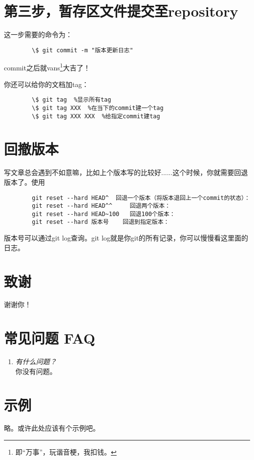 \documentclass[cn,hazy,sakura,screen,14pt]{elegantnote}
\begin{document}
	\section{第三步，暂存区文件提交至repository}
	这一步需要的命令为：
	\begin{lstlisting}
		\$ git commit -m "版本更新日志"	
	\end{lstlisting}	
	commit之后就vans\footnote{即“万事”，玩谐音梗，我扣钱。}大吉了！

	\begin{note}
		你还可以给你的文档加tag：
		\begin{lstlisting}
		\$ git tag  %显示所有tag
		\$ git tag XXX 	%在当下的commit建一个tag
		\$ git tag XXX XXX 	%给指定commit建tag
		\end{lstlisting}
	\end{note}
	
	\section{回撤版本}	
	写文章总会遇到不如意嘛，比如上个版本写的比较好......这个时候，你就需要回退版本了。使用
	\begin{lstlisting}
		git reset --hard HEAD^ 	回退一个版本（将版本退回上一个commit的状态）：
		git reset --hard HEAD^^ 	回退两个版本：
		git reset --hard HEAD~100  	回退100个版本：
		git reset --hard 版本号  	回退到指定版本：	
	\end{lstlisting}
	版本号可以通过git log查询。git log就是你git的所有记录，你可以慢慢看这里面的日志。
	
	\section{致谢}
	谢谢你！
		
	
	\section{常见问题 FAQ}
	\begin{enumerate}[label=\arabic*).]
		\item \textit{有什么问题？}\\
		你没有问题。
	\end{enumerate}
	
	\section{示例}
	略。或许此处应该有个示例吧。
	
\end{document}
